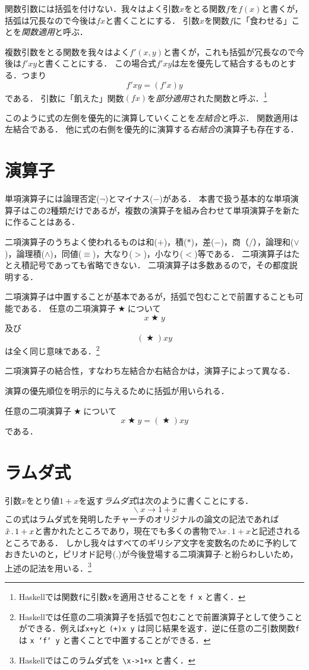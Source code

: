 \documentclass[twocolumn]{jsbook}
\DeclareMathOperator{\mathAnyBinaryOperator}{\bigstar}
\DeclareMathOperator{\mathLambda}{\backslash}
\newcommand{\mathLambdaArrow}{\rightarrow}
\newcommand{\mathLambdaExpression}[2]{\mathLambda#1\mathLambdaArrow#2}
\newcommand{\keyword}[1]{\emph{#1}}
\newcommand{\code}[1]{\texttt{#1}}
\newenvironment{point}{\begin{screen}}{\end{screen}}
\begin{document}
関数引数には括弧を付けない．我々はよく引数$x$をとる関数$f$を$f(x)$と書くが，括弧は冗長なので今後は$fx$と書くことにする．
引数$x$を関数$f$に「食わせる」ことを\keyword{関数適用}と呼ぶ．

複数引数をとる関数を我々はよく$f'(x,y)$と書くが，これも括弧が冗長なので今後は$f'xy$と書くことにする．
この場合式$f'xy$は左を優先して結合するものとする．つまり$$f'xy=(f'x)y$$である．
引数に「飢えた」関数$(fx)$を\keyword{部分適用}された関数と呼ぶ．\footnote{Haskellでは関数\code{f}に引数\code{x}を適用させることを \code{f x} と書く．}

このように式の左側を優先的に演算していくことを\keyword{左結合}と呼ぶ．
関数適用は左結合である．
他に式の右側を優先的に演算する\keyword{右結合}の演算子も存在する．

\section{演算子}

単項演算子には論理否定($\neg$)とマイナス($-$)がある．
本書で扱う基本的な単項演算子はこの2種類だけであるが，複数の演算子を組み合わせて単項演算子を新たに作ることはある．

二項演算子のうちよく使われるものは和($+$)，積($*$)，差($-$)，商（$/$），論理和($\vee$)，論理積($\wedge$)，同値($\equiv$)，大なり($>$)，小なり($<$)等である．
二項演算子はたとえ積記号であっても省略できない．
二項演算子は多数あるので，その都度説明する．

二項演算子は中置することが基本であるが，括弧で包むことで前置することも可能である．
任意の二項演算子$\mathAnyBinaryOperator$について$$x\mathAnyBinaryOperator y$$及び$$(\mathAnyBinaryOperator)xy$$は全く同じ意味である．\footnote{Haskellでは任意の二項演算子を括弧で包むことで前置演算子として使うことができる．例えば\code{x+y}と \code{(+)x y} は同じ結果を返す．逆に任意の二引数関数\code{f}は \code{x `f` y} と書くことで中置することができる．}

二項演算子の結合性，すなわち左結合か右結合かは，演算子によって異なる．

演算の優先順位を明示的に与えるために括弧が用いられる．

\begin{point}
任意の二項演算子$\mathAnyBinaryOperator$について$$x\mathAnyBinaryOperator y=(\mathAnyBinaryOperator)xy$$である．
\end{point}

\section{ラムダ式}
引数$x$をとり値$1+x$を返す\keyword{ラムダ式}は次のように書くことにする．
$$\mathLambdaExpression{x}{1+x}$$
この式はラムダ式を発明したチャーチのオリジナルの論文の記法であれば$\Hat x\,.\,1+x$と書かれたところであり，現在でも多くの書物で$\lambda x\,.\,1+x$と記述されるところである．
しかし我々はすべてのギリシア文字を変数名のために予約しておきたいのと，ピリオド記号($.$)が今後登場する二項演算子$\cdot$と紛らわしいため，上述の記法を用いる．\footnote{Haskellではこのラムダ式を \code{\textbackslash x->1+x} と書く．}
\end{document}
